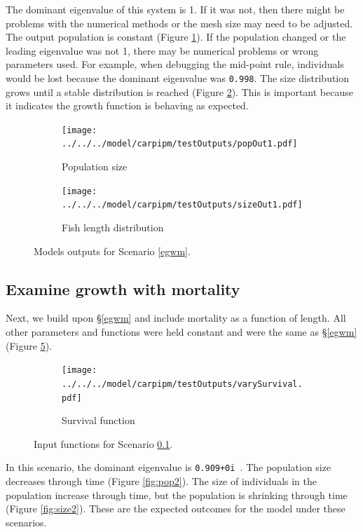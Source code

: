 \documentclass{article}[12pt]
\begin{document}
The dominant eigenvalue of this system is 1.
If it was not, then there might be problems with the numerical methods or the mesh size may need to be adjusted. 
The output population is constant (Figure \ref{fig:pop1}). 
If the population changed or the leading eigenvalue was not 1, there may be numerical problems or wrong parameters used.
For example, when debugging the mid-point rule, individuals would be lost because the dominant eigenvalue was \texttt{0.998}.
The size distribution grows until a stable distribution is reached (Figure \ref{fig:size1}).
This is important because it indicates the growth function is behaving as expected.


\begin{figure}[htbp]
	\centering
	\begin{subfigure}[b]{0.45\textwidth}
		\texttt{[image: ../../../model/carpipm/testOutputs/popOut1.pdf]} 
		\caption{Population size} 
		\label{fig:pop1}
	\end{subfigure}
	\qquad
	\begin{subfigure}[b]{0.45\textwidth}
		\texttt{[image: ../../../model/carpipm/testOutputs/sizeOut1.pdf]} 
		\caption{Fish length distribution} 
		\label{fig:size1}
	\end{subfigure}
   \caption{Models outputs for Scenario \ref{egwm}.}
   \label{fig:scn1out}
\end{figure}


\subsection{Examine growth with mortality}\label{egwim}

Next, we build upon \S \ref{egwm} and include mortality as a function of length.
All other parameters and functions were held constant and were the same as \S \ref{egwm} (Figure \ref{fig:scn1}).

\begin{figure}[htbp]
	\centering
	\begin{subfigure}[b]{0.45\textwidth}
		\texttt{[image: ../../../model/carpipm/testOutputs/varySurvival.pdf]} 
		\caption{Survival function} 
		\label{fig:suv1}
	\end{subfigure}
   \caption{Input functions for Scenario \ref{egwim}.}
   \label{fig:scn1}
\end{figure}

In this scenario, the dominant eigenvalue is \texttt{0.909+0i }.
The population size decreases through time (Figure \ref{fig:pop2}).
The size of individuals in the population increase through time, but the population is shrinking through time (Figure \ref{fig:size2}).
These are the expected outcomes for the model under these scenarios. 
\end{document}
